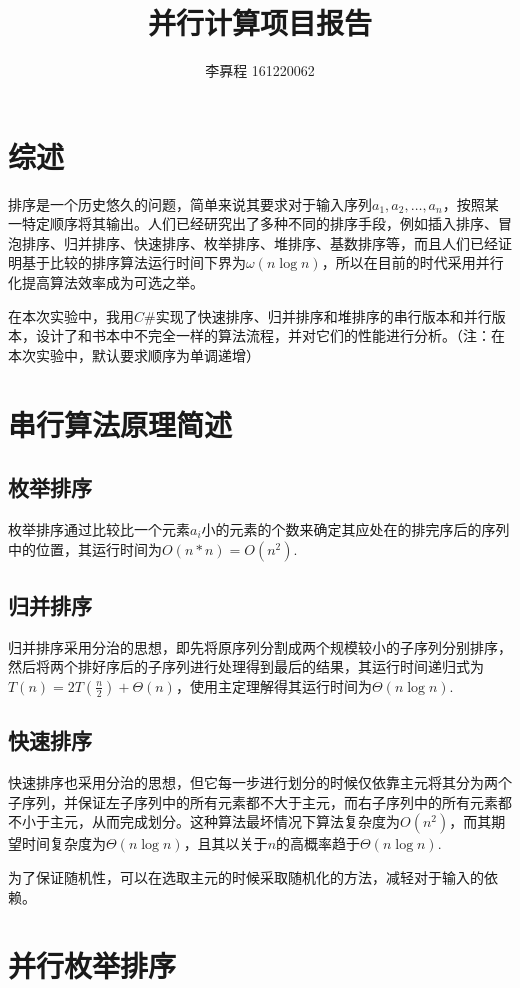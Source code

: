 \documentclass[UTF8]{article}
\begin{document}
\author{李奡程 161220062}
\title{并行计算项目报告}
\maketitle
\section{综述}
排序是一个历史悠久的问题，简单来说其要求对于输入序列$a_1,a_2,\ldots,a_n$，按照某一特定顺序将其输出。人们已经研究出了多种不同的排序手段，例如插入排序、冒泡排序、归并排序、快速排序、枚举排序、堆排序、基数排序等，而且人们已经证明基于比较的排序算法运行时间下界为$\omega(n\log n)$，所以在目前的时代采用并行化提高算法效率成为可选之举。
\par 在本次实验中，我用$C\#$实现了快速排序、归并排序和堆排序的串行版本和并行版本，设计了和书本中不完全一样的算法流程，并对它们的性能进行分析。（注：在本次实验中，默认要求顺序为单调递增）
\section{串行算法原理简述}
\subsection{枚举排序}
枚举排序通过比较比一个元素$a_i$小的元素的个数来确定其应处在的排完序后的序列中的位置，其运行时间为$O(n*n)=O(n^2)$.
\subsection{归并排序}
归并排序采用分治的思想，即先将原序列分割成两个规模较小的子序列分别排序，然后将两个排好序后的子序列进行处理得到最后的结果，其运行时间递归式为$T(n)=2T(\frac{n}{2})+\Theta(n)$，使用主定理解得其运行时间为$\Theta(n\log n)$.
\subsection{快速排序}
快速排序也采用分治的思想，但它每一步进行划分的时候仅依靠主元将其分为两个子序列，并保证左子序列中的所有元素都不大于主元，而右子序列中的所有元素都不小于主元，从而完成划分。这种算法最坏情况下算法复杂度为$O(n^2)$，而其期望时间复杂度为$\Theta(n\log n)$，且其以关于$n$的高概率趋于$\Theta(n\log n)$.
\par 为了保证随机性，可以在选取主元的时候采取随机化的方法，减轻对于输入的依赖。
\section{并行枚举排序}
\end{document}
